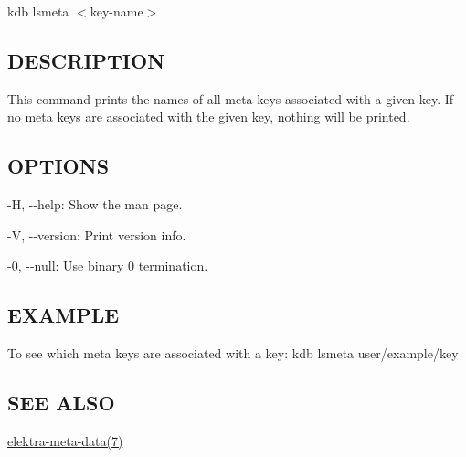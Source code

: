 {\ttfamily kdb lsmeta $<$key-\/name$>$}

\subsection*{D\+E\+S\+C\+R\+I\+P\+T\+I\+O\+N}

This command prints the names of all meta keys associated with a given key. If no meta keys are associated with the given key, nothing will be printed.

\subsection*{O\+P\+T\+I\+O\+N\+S}


\begin{DoxyItemize}
\item {\ttfamily -\/\+H}, {\ttfamily -\/-\/help}\+: Show the man page.
\item {\ttfamily -\/\+V}, {\ttfamily -\/-\/version}\+: Print version info.
\item {\ttfamily -\/0}, {\ttfamily -\/-\/null}\+: Use binary 0 termination.
\end{DoxyItemize}

\subsection*{E\+X\+A\+M\+P\+L\+E}

To see which meta keys are associated with a key\+: {\ttfamily kdb lsmeta user/example/key}

\subsection*{S\+E\+E A\+L\+S\+O}


\begin{DoxyItemize}
\item \hyperlink{md_doc_help_elektra-meta-data_doc_help_elektra-meta-data_md}{elektra-\/meta-\/data(7)} 
\end{DoxyItemize}